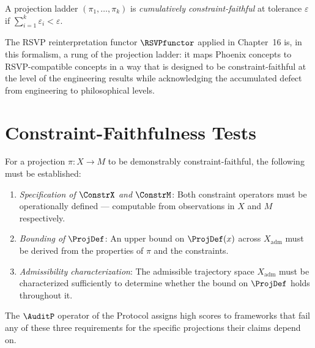 \begin{definition}
A projection ladder $(\pi_1, \ldots, \pi_k)$ is
\emph{cumulatively constraint-faithful} at tolerance
$\varepsilon$ if $\sum_{i=1}^k \varepsilon_i < \varepsilon$.
\end{definition}

The RSVP reinterpretation functor $\RSVPfunctor$
applied in Chapter~16 is, in this formalism, a
rung of the projection ladder: it maps Phoenix concepts
to RSVP-compatible concepts in a way that is designed
to be constraint-faithful at the level of the engineering
results while acknowledging the accumulated defect
from engineering to philosophical levels.

\section{Constraint-Faithfulness Tests}
\label{app-a:faithfulness-tests}

For a projection $\pi : X \to M$ to be demonstrably
constraint-faithful, the following must be established:

\begin{enumerate}
  \item \textit{Specification of $\ConstrX$ and $\ConstrM$}:
  Both constraint operators must be operationally defined
  --- computable from observations in $X$ and $M$
  respectively.
  \item \textit{Bounding of $\ProjDef$}: An upper bound
  on $\ProjDef(x)$ across $X_{\mathrm{adm}}$ must be
  derived from the properties of $\pi$ and the constraints.
  \item \textit{Admissibility characterization}: The
  admissible trajectory space $X_{\mathrm{adm}}$ must
  be characterized sufficiently to determine whether
  the bound on $\ProjDef$ holds throughout it.
\end{enumerate}

The $\AuditP$ operator of the \Ortyx{} Protocol assigns
high scores to frameworks that fail any of these three
requirements for the specific projections their claims
depend on.
